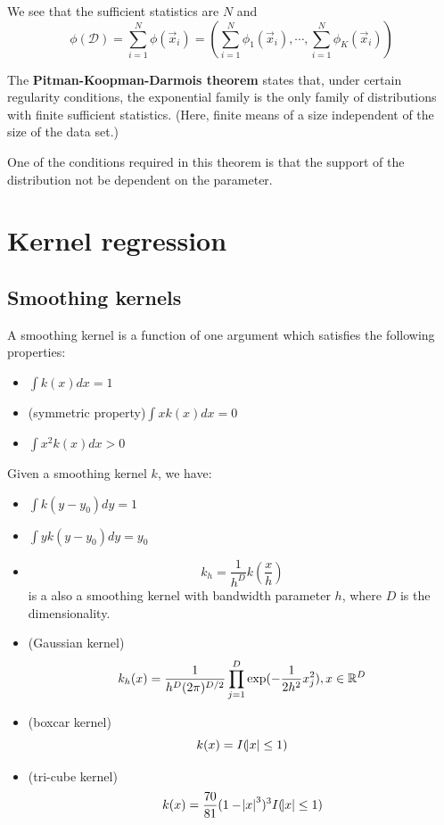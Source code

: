 \begin{refsection}
We see that the sufficient statistics are $N$ and
\begin{equation}
\phi(\mathcal{D})=\sum\limits_{i=1}^N \phi(\vec{x}_i)=(\sum\limits_{i=1}^N \phi_1(\vec{x}_i),\cdots,\sum\limits_{i=1}^N \phi_K(\vec{x}_i))
\end{equation}

The \textbf{Pitman-Koopman-Darmois theorem} states that, under certain regularity conditions, the exponential family is the only family of distributions with finite sufficient statistics. (Here, finite means of a size independent of the size of the data set.)

One of the conditions required in this theorem is that the support of the distribution not be dependent on the parameter.


\section{Kernel regression}
\subsection{Smoothing kernels}
\begin{definition}\cite[509]{murphy2012machine}
A smoothing kernel is a function of one argument which satisfies the following properties:
\begin{itemize}
	\item $\int k(x) dx= 1$
	\item (symmetric property)$\int xk(x) dx = 0$
	\item $\int x^2k(x) dx > 0$
\end{itemize}
\end{definition}

\begin{lemma}
Given a smoothing kernel $k$, we have:
\begin{itemize}
	\item $\int k(y-y_0)dy = 1$
	\item $\int yk(y - y_0)dy = y_0$
	\item $$k_h = \frac{1}{h^D}k(\frac{x}{h})$$ is a also a smoothing kernel with bandwidth parameter $h$, where $D$ is the dimensionality. 
\end{itemize}
\end{lemma}


\begin{example}\hfill
\begin{itemize}
	\item (Gaussian kernel)
	$$k_h(x) = \frac{1}{h^D(2\pi)^{D/2}} \prod_{j=1}^D \exp(-\frac{1}{2h^2}x_j^2),x\in \mathbb{R}^D$$
	\item (boxcar kernel)
	$$k(x) = I(\abs{x} \leq 1)$$
	\item (tri-cube kernel)
	$$k(x) = \frac{70}{81}(1 - \abs{x}^3)^3I(\abs{x}\leq 1)$$
\end{itemize}
\end{example}





\end{refsection}
